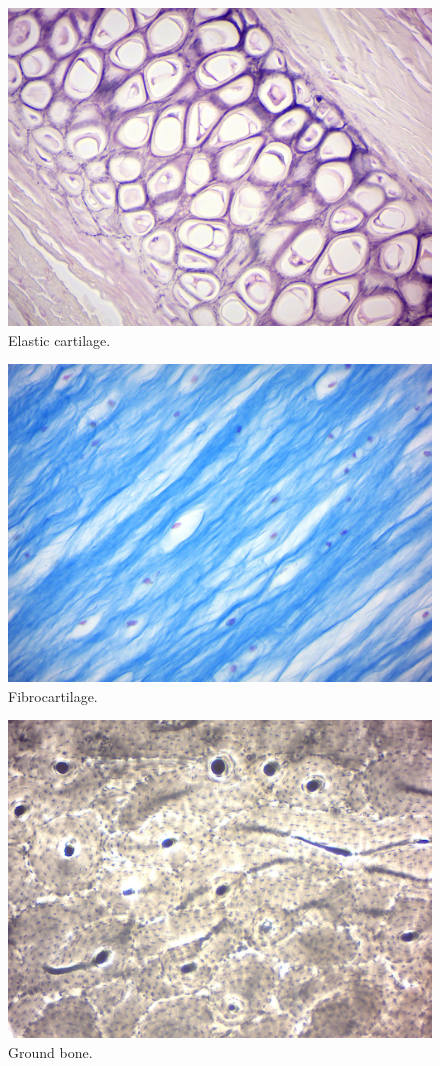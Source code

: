 \begin{figure}

{\centering \includegraphics[width=0.7\linewidth]{./figures/tissues/elastic_cartilage}

}

\caption{Elastic cartilage.}\label{fig:elastic}
\end{figure}

\begin{figure}

{\centering \includegraphics[width=0.7\linewidth]{./figures/tissues/fibrocartilage}

}

\caption{Fibrocartilage.}\label{fig:fibro}
\end{figure}

\begin{figure}

{\centering \includegraphics[width=0.7\linewidth]{./figures/tissues/ground_bone}

}

\caption{Ground bone.}\label{fig:groundbone}
\end{figure}


